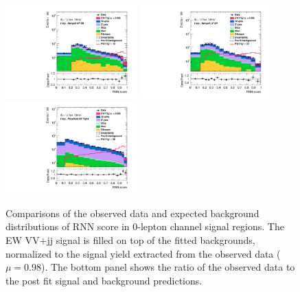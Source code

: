 \begin{figure}[]
    \centering
    \includegraphics[width=0.45\textwidth]{figures/PostFit/Region_distRNN_DSRVBSHP_BMin0_J0_incJet1_L0_T0_incFat1_Y6051_incTag1_Fat1_GlobalFit_unconditionnal_mu1log}
    \includegraphics[width=0.45\textwidth]{figures/PostFit/Region_distRNN_DSRVBSLP_BMin0_J0_incJet1_L0_T0_incFat1_Y6051_incTag1_Fat1_GlobalFit_unconditionnal_mu1log}
    \includegraphics[width=0.45\textwidth]{figures/PostFit/Region_distRNN_DSRVBSFid_BMin0_T0_Y6051_incTag1_J2_L0_incJet1_GlobalFit_unconditionnal_mu1log}
      \caption{Comparisons of the observed data and expected background distributions of RNN score in 0-lepton channel signal regions. The EW VV+jj signal is filled on top of the fitted backgrounds, normalized to the signal yield extracted from the observed data ($\mu = 0.98$). The bottom panel shows the ratio of the observed data to the post fit signal and background predictions.}
      \label{fig:postSR0lep}
\end{figure}
